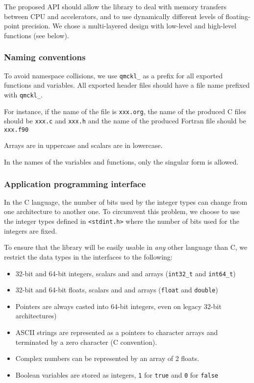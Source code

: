 The proposed \ac{API} should allow the library to deal with memory
transfers between CPU and accelerators, and to use dynamically
different levels of floating-point precision.  We chose a
multi-layered design with low-level and high-level functions (see
below).

\subsubsection{Naming conventions}

To avoid namespace collisions, we use \texttt{qmckl_} as a prefix for
all exported functions and variables.  All exported header files
should have a file name prefixed with \texttt{qmckl_}.

For instance, if the name of the {\orgmode} file is
\texttt{xxx.org}, the name of the produced C files should
be \texttt{xxx.c} and \texttt{xxx.h} and the
name of the produced Fortran file should be
\texttt{xxx.f90}

Arrays are in uppercase and scalars are in lowercase.

In the  names of  the variables and  functions, only the singular
form is allowed.

\subsubsection{Application programming interface}

In the C language, the number of bits used by the integer types can
change from one architecture to another one. To circumvent this
problem, we choose to use the integer types defined in
\texttt{<stdint.h>} where the number of bits used for the
integers are fixed.

To ensure that the library will be easily usable in \emph{any} other
language than C, we restrict the data types in the interfaces to the
following:
\begin{itemize}
\item 32-bit and 64-bit integers, scalars and and arrays
  (\texttt{int32_t} and \texttt{int64_t})
\item 32-bit and 64-bit floats, scalars and and arrays
  (\texttt{float} and \texttt{double})
\item Pointers are always casted into 64-bit integers, even on legacy 32-bit architectures)
\item ASCII strings are represented as a pointers to character arrays
  and terminated by a zero character (C convention).
\item Complex numbers can be represented by an array of 2 floats.
\item Boolean variables are stored as integers, \texttt{1} for \texttt{true}
and \texttt{0} for \texttt{false}
\end{itemize}

